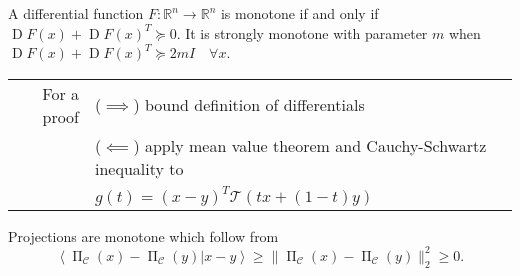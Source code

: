\documentclass[varwidth=15cm, border=.5cm]{standalone}
\DeclareMathOperator{\jacobian}{D}
\DeclareMathOperator{\proj}{\Pi}
\newcommand*\from{\colon}
\newcommand{\innerp}[2]{\left\langle #1 \vert #2 \right\rangle}
\begin{document}
\begin{definition}[label=1_xd5vw5, name=Monotone Operators and Coercivity]
	\begin{example}[label=ui6ez2bq, name=Differentiable Function]
		A differential function \(F\from\mathbb R^n\to\mathbb R^n\) is monotone
		if and only if \(\jacobian F(x) + \jacobian F(x)^T \succeq 0\). It is
		strongly monotone with parameter \(m\) when \(\jacobian F(x) + \jacobian
		F(x)^T\succeq 2mI\quad\forall x\).
		\begin{tabular}{rl}
			For a proof & (\( \implies \)) bound definition of differentials \\
				    & (\( \impliedby \)) apply mean value
				    theorem and Cauchy-Schwartz inequality to \\
				    &\quad\(g(t) = (x - y)^T\mathcal T(tx +
				    (1-t) y) \)
		\end{tabular}
	\end{example}
	\begin{example}[label=vuj2l97d, name=Projections]
		Projections are monotone which follow from
		\[
			\innerp{\proj_{\mathcal C}(x) - \proj_{\mathcal C}(y)}{x-y} \geq \lVert\proj_{\mathcal C}(x) - \proj_{\mathcal C}(y)\lVert^2_2 \geq 0.
		\]
	\end{example}
\end{definition}
\printbibliography
\end{document}
